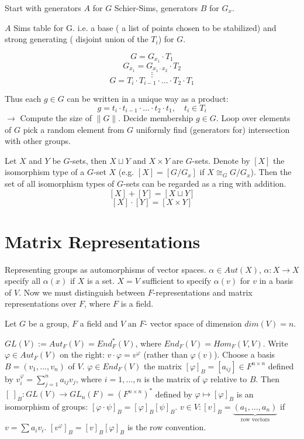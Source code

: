 \documentclass[12pt]{amsart}
\theoremstyle{definition}
\begin{document}
Start with generators $A$ for $G$ Schier-Sims, generators $B$ for $G_{x}$.

$A$ Sims table for G. i.e. a base ( a list of points chosen to be stabilized) and strong generating ( disjoint union of the $T_{i}$) for $G$.

$$G = G_{x_{1}} \cdot T_{1}$$
$$G_{x_{1}} = G_{x_{1} \cdot x_{2}} \cdot T_{2}$$
$$ \vdots$$
$$G = T_{i} \cdot T_{i - 1} \cdot \ldots \cdot T_{2} \cdot T_{1}$$

Thus each $g \in G$ can be written in a unique way as a product:
$$g = t_{i} \cdot t_{i - 1} \cdot \ldots \cdot t_{2} \cdot t_{1}, \quad t_{i} \in T_{i}$$
 $\rightarrow$ Compute the size of $\| G \|$. Decide membership $g \in G$. Loop over elements of $G$ pick a random element from $G$ uniformly find (generators for) intersection with other groups.

Let $X$ and $Y$ be $G$-sets, then $X \sqcup Y$ and $X \times Y$ are $G$-sets. Denote by $[X]$ the isomorphism type of a $G$-set $X$ (e.g. $[X] = [G/G_{x}]$ if $X \cong_{G} G/G_{x}$). Then the set of all isomorphism types of $G$-sets can be regarded as a ring with addition. $$[X] + [Y] = [X \sqcup Y]$$ $$[X] \cdot [Y] = [ X \times Y]$$

\section{Matrix Representations}

Representing groups as automorphisms of vector spaces. $\alpha \in Aut(X)$, $\alpha: X \rightarrow X$ specify all $\alpha (x)$ if $X$ is a set. $X = V$ sufficient to specify $\alpha (v)$ for $v$ in a basis of $V$. Now we must distinguish between $F$-representations and matrix representations over $F$, where $F$ is a field.

Let $G$ be a group, $F$ a field and $V$ an $F$- vector space of dimension $dim(V) = n$.

$GL(V) := Aut_{F} (V) = End_{F}^{\ast} (V)$, where $End_{F} (V) = Hom_{F} (V, V)$. Write $\varphi \in Aut_{F} (V)$ on the right: $v \cdot \varphi = v^{\varphi}$ (rather than $\varphi (v)$). Choose a basis $B = \left( v_{1}, \ldots, v_{n} \right)$ of $V$. $\varphi \in End_{F} (V)$ the matrix $[ \varphi ]_{B} = [ a_{i j} ] \in F^{n \times n}$ defined by $v_{i}^{\varphi}  = \sum_{j = 1}^{n} {a_{ij}}{v_{j}}$, where $i = 1, \ldots, n$ is the matrix of $\varphi$ relative to $B$. Then $[ \  ]_{B} : GL(V) \rightarrow GL_{n} (F) = \left( F^{n \times n} \right)^{\ast}$ defined by $\varphi \mapsto [ \varphi ]_{B}$ is an isomorphism of groups: $[ \varphi \cdot \psi ]_{B} = [ \varphi ]_{B} [ \psi ]_{B}$. $v \in V: [ v ]_{B} = \underbrace{\left( a_{1}, \ldots, a_{n} \right)}_{\text{row vectors}}$ if $v = \sum{a_{i}}{v_{i}}$. $\left[ v^{\varphi} \right]_{B} = [v]_{B} [ \varphi ]_{B}$ is the row convention.
\end{document}
